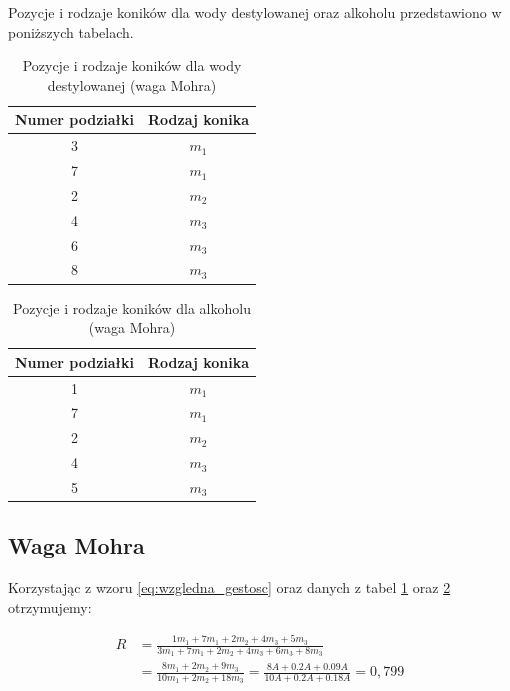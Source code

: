 \documentclass[a4paper,12pt]{article}
\begin{document}
Pozycje i rodzaje koników dla wody destylowanej oraz alkoholu przedstawiono w poniższych tabelach.

\begin{table}[H]
    \centering
    \begin{tabular}{|c|c|}
        \hline
        Numer podziałki & Rodzaj konika \\
        \hline
        3 & $m_1$ \\
        7 & $m_1$ \\
        2 & $m_2$ \\
        4 & $m_3$ \\
        6 & $m_3$ \\
        8 & $m_3$ \\
        \hline
    \end{tabular}
    \caption{Pozycje i rodzaje koników dla wody destylowanej (waga Mohra)}
    \label{tab:waga_mohra_woda}
\end{table}

\begin{table}[H]
    \centering
    \begin{tabular}{|c|c|}
        \hline
        Numer podziałki & Rodzaj konika \\
        \hline
        1 & $m_1$ \\
        7 & $m_1$ \\
        2 & $m_2$ \\
        4 & $m_3$ \\
        5 & $m_3$ \\
        \hline
    \end{tabular}
    \caption{Pozycje i rodzaje koników dla alkoholu (waga Mohra)}
    \label{tab:waga_mohra_alkohol}
\end{table}


\subsection{Waga Mohra}

Korzystając z wzoru \eqref{eq:wzgledna_gestosc} oraz danych z tabel \ref{tab:waga_mohra_woda} oraz \ref{tab:waga_mohra_alkohol} otrzymujemy:

\begin{align*}
    R & = \frac{1 m_1 + 7 m_1 + 2 m_2 + 4 m_3 + 5 m_3}{3 m_1 + 7 m_1 + 2 m_2 + 4 m_3 + 6 m_3 + 8 m_3}                            \\
      & = \frac{8 m_1 + 2 m_2 + 9 m_3}{10 m_1 + 2 m_2 + 18 m_3}  = \frac{8 A + 0.2 A + 0.09 A}{10 A + 0.2 A + 0.18 A}  = 0{,}799
\end{align*}
\end{document}
